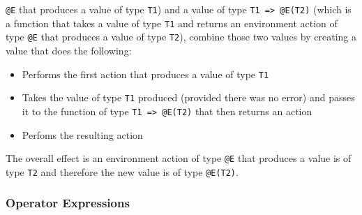 \documentclass{article}
\begin{document}
\texttt{@E} that produces a value of type \texttt{T1}) and a value of type
\texttt{T1 => @E(T2)} (which is a function that takes a value of type
\texttt{T1} and returns an environment action of type \texttt{@E} that produces
a value of type \texttt{T2}), combine those two values by creating a value that
does the following: 
\begin{itemize}
\item
Performs the first action that produces a value of type \texttt{T1}

\item
Takes the value of type \texttt{T1} produced (provided there was no error) and
passes it to the function of type \texttt{T1 => @E(T2)} that then returns an
action

\item
Perfoms the resulting action 
\end{itemize}
The overall effect is an environment action  of type \texttt{@E} that produces
a value is of type \texttt{T2} and therefore the new value is of type
\texttt{@E(T2)}.

\newpage

\subsubsection{Operator Expressions}
\end{document}
